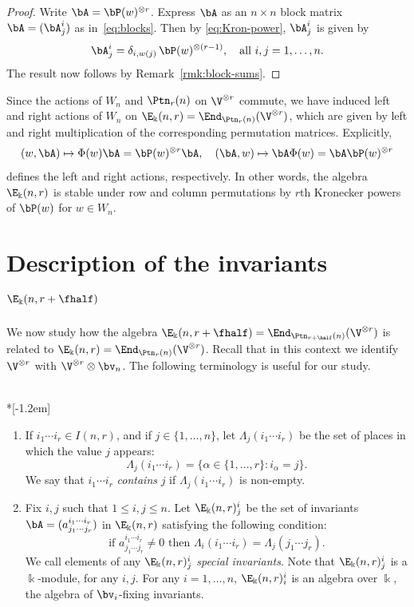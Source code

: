 \begin{proof}
Write $\bA = \bP(w)^{\otimes r}$. Express $\bA$ as an $n \times n$
block matrix $\bA = (\bA^i_j)$ as in~\eqref{eq:blocks}. Then by
\eqref{eq:Kron-power}, $\bA^i_j$ is given by
\[
\bA^i_j = \delta_{i, w(j)} \, \bP(w)^{\otimes (r-1)}, \quad \text{all
} i,j = 1, \dots, n.
\]
The result now follows by Remark~\ref{rmk:block-sums}. 
\end{proof}

Since the actions of $W_n$ and $\Ptn_r(n)$ on $\V^{\otimes r}$
commute, we have induced left and right actions of $W_n$ on
$\E_\Bbbk(n,r) = \End_{\Ptn_r(n)}(\V^{\otimes r})$, which are given by
left and right multiplication of the corresponding permutation
matrices. Explicitly,
\begin{equation}\label{eq:W_n-actions}
 (w, \bA) \mapsto \Phi(w) \bA = \bP(w)^{\otimes r} \bA, \quad
 (\bA,w) \mapsto \bA \Phi(w) = \bA \bP(w)^{\otimes r} 
\end{equation}
defines the left and right actions, respectively. In other words, the
algebra $\E_\Bbbk(n,r)$ is stable under row and column permutations by
$r$th Kronecker powers of $\bP(w)$ for $w \in W_n$. 


\section{Description of the invariants \texorpdfstring{$\E_\Bbbk(n,r+\fhalf)$}{Ek (n,r+1/2)}}%
\label{sec:special}%
We now study how the algebra $\E_\Bbbk(n,r+\fhalf)
= \End_{\Ptn_{r+\half}(n)}(\V^{\otimes r})$ is related to
$\E_\Bbbk(n,r) = \End_{\Ptn_r(n)}(\V^{\otimes r})$. Recall that in
this context we identify $\V^{\otimes r}$ with $\V^{\otimes r}
\otimes \bv_n$. The following terminology is useful for our study.

\begin{defi}\label{def:special}\ \\*[-1.2em]
\begin{enumerate}[label=(\alph*)] 
\item \label{defi4.1_i}
If $i_1 \cdots i_r \in I(n,r)$, and if $j \in \{1, \dots, n\}$,
let $\Lambda_j(i_1 \cdots i_r)$ be the set of places in which the
value $j$ appears:
\[
\Lambda_j(i_1 \cdots i_r) = \{ \alpha \in \{1, \dots, r\} : i_\alpha =
j \}.
\]
We say that $i_1\cdots i_r$ \emph{contains} $j$ if $\Lambda_j(i_1
\cdots i_r)$ is non-empty.


\item \label{defi4.1_ii}
 Fix $i,j$ such that $1 \le i,j \le n$. Let $\E_\Bbbk(n,r)^i_j$ be
the set of invariants $\bA = (a^{i_1 \cdots i_r}_{j_1 \cdots j_r})$ in
$\E_\Bbbk(n,r)$ satisfying the following condition:
\[
\text{if $a^{i_1 \cdots i_r}_{j_1 \cdots j_r} \ne 0$ then
 $\Lambda_i(i_1 \cdots i_r) = \Lambda_j(j_1 \cdots j_r)$.}
\]
We call elements of any $\E_\Bbbk(n,r)^i_j$ \emph{special
 invariants}. Note that $\E_\Bbbk(n,r)^i_j$ is a $\Bbbk$-module, for
any $i,j$. For any $i = 1, \dots, n$, $\E_\Bbbk(n,r)^i_i$ is an
algebra over $\Bbbk$, the algebra of $\bv_i$-fixing invariants.
\end{enumerate}
\end{defi}

